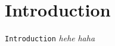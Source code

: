 \section{Introduction}
\label{sec:introduction}

\texttt{Introduction}
\textit{hehe}
\textsl{haha}

